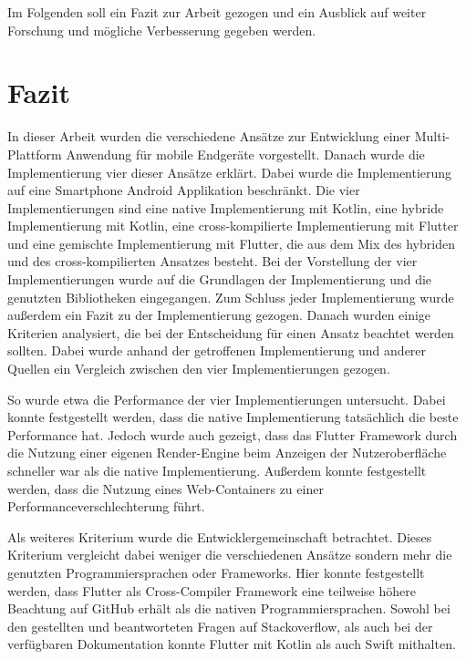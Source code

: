 Im Folgenden soll ein Fazit zur Arbeit gezogen und ein Ausblick auf weiter Forschung und mögliche Verbesserung gegeben werden.

\section{Fazit}
In dieser Arbeit wurden die verschiedene Ansätze zur Entwicklung einer Multi-Plattform Anwendung für mobile Endgeräte vorgestellt. Danach wurde die Implementierung vier dieser Ansätze erklärt. Dabei wurde die Implementierung auf eine Smartphone Android Applikation beschränkt. Die vier Implementierungen sind eine native Implementierung mit Kotlin, eine hybride Implementierung mit Kotlin, eine cross-kompilierte Implementierung mit Flutter und eine gemischte Implementierung mit Flutter, die aus dem Mix des hybriden und des cross-kompilierten Ansatzes besteht. Bei der Vorstellung der vier Implementierungen wurde auf die Grundlagen der Implementierung und die genutzten Bibliotheken eingegangen. Zum Schluss jeder Implementierung wurde außerdem ein Fazit zu der Implementierung gezogen. Danach wurden einige Kriterien analysiert, die bei der Entscheidung für einen Ansatz beachtet werden sollten. Dabei wurde anhand der getroffenen Implementierung und anderer Quellen ein Vergleich zwischen den vier Implementierungen gezogen.

So wurde etwa die Performance der vier Implementierungen untersucht. Dabei konnte festgestellt werden, dass die native Implementierung tatsächlich die beste Performance hat. Jedoch wurde auch gezeigt, dass das Flutter Framework durch die Nutzung einer eigenen Render-Engine beim Anzeigen der Nutzeroberfläche schneller war als die native Implementierung. Außerdem konnte festgestellt werden, dass die Nutzung eines Web-Containers zu einer Performanceverschlechterung führt. 


Als weiteres Kriterium wurde die Entwicklergemeinschaft betrachtet. Dieses Kriterium vergleicht dabei weniger die verschiedenen Ansätze sondern mehr die genutzten Programmiersprachen oder Frameworks. 
Hier konnte festgestellt werden, dass Flutter als Cross-Compiler Framework eine teilweise höhere Beachtung auf GitHub erhält als die nativen Programmiersprachen. 
Sowohl bei den gestellten und beantworteten Fragen auf Stackoverflow, als auch bei der verfügbaren Dokumentation konnte Flutter mit Kotlin als auch Swift mithalten.

